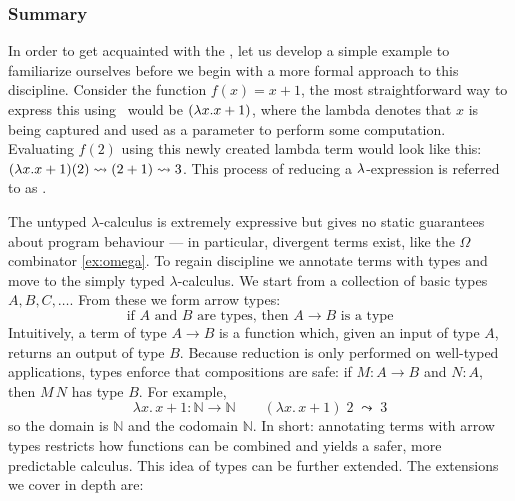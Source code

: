 \subsubsection*{\centering Summary}

In order to get acquainted with the \lcalc, let us develop a simple example to familiarize ourselves before we begin with a more formal approach to this discipline. Consider the function $f(x) = x + 1$, the most straightforward way to express this using \lcalc \ would be $(\lambda x . x + 1 )$, where the lambda denotes that $x$ is being captured and used as a parameter to perform some computation. Evaluating $f(2)$ using this newly created lambda term would look like this: $(\lambda x . x + 1)(2) \mathrel{\leadsto} (2 + 1) \mathrel{\leadsto} 3$. This process of reducing a $\lambda$-expression is referred to as \bred.

The untyped $\lambda$-calculus is extremely expressive but gives no static guarantees about program behaviour --- in particular, divergent terms exist, like the $\Omega$ combinator \ref{ex:omega}. To regain discipline we annotate terms with types and move to the simply typed $\lambda$-calculus. We start from a collection of basic types $A,B,C,\dots$. From these we form arrow types:
\[
  \text{if }A\text{ and }B\text{ are types, then }A \to B \text{ is a type}
\]
Intuitively, a term of type $A \to B$ is a function which, given an input of type $A$, returns an output of type $B$. Because reduction is only performed on well-typed applications, types enforce that compositions are safe: if $M : A \to B$ and $N : A$, then $M\,N$ has type $B$. For example,
\[
  \lambda x.\,x+1 : \mathbb{N} \to \mathbb{N}
  \qquad
  (\lambda x.\,x+1)\;2 \;\leadsto\; 3
\]
so the domain is $\mathbb{N}$ and the codomain $\mathbb{N}$. In short: annotating terms with arrow types restricts how functions can be combined and yields a safer, more predictable calculus. This idea of types can be further extended. The extensions we cover in depth are:

